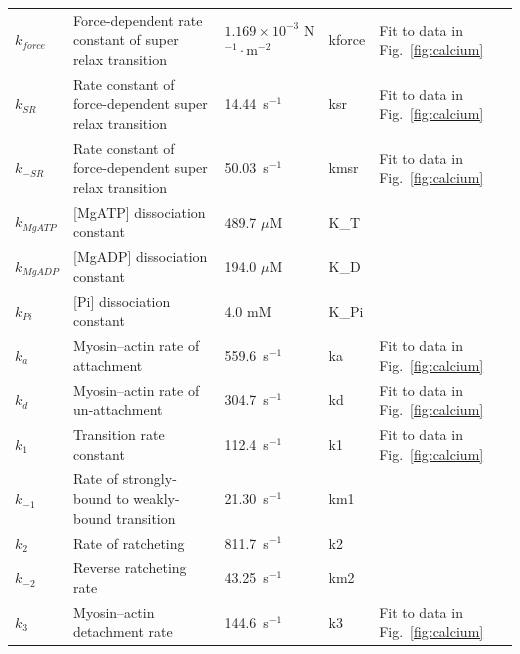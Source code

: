 \documentclass[fleqn,10pt]{physiome}
\begin{document}
\begin{table}[!htb]
\begin{supertabular}{p{1.4cm} p{4.4cm} p{1.8cm} p{2.0cm} p{2.0cm}}
$k_{force}$ & 
 Force-dependent  rate constant of super relax transition  & 
  $1.169 \times 10^{-3}$ N$^{-1}\cdot$m$^{-2}$ & kforce &
Fit to data in Fig.~\ref{fig:calcium}  \\

$k_{SR}$ & 
Rate constant of force-dependent super relax transition  & 
14.44~s$^{-1}$ & 
ksr &
Fit to data in Fig.~\ref{fig:calcium}  \\

$k_{-SR}$ & 
Rate constant of force-dependent super relax transition  & 
50.03~s$^{-1}$ & 
kmsr &
Fit to data in Fig.~\ref{fig:calcium}  \\

$k_{MgATP}$ & 
[MgATP] dissociation constant  & 
489.7 $\mu$M &
K\_T &
\cite{Tewari2016b} \\

$k_{MgADP}$ & 
[MgADP] dissociation constant  & 
194.0 $\mu$M &
K\_D &
\cite{Tewari2016b} \\

$k_{Pi}$ & 
[Pi] dissociation constant  & 
4.0 mM &
K\_Pi &
\cite{Tewari2016b} \\

$k_a$ & 
Myosin–actin rate of attachment  & 
559.6~s$^{-1}$ & 
ka &
Fit to data in Fig.~\ref{fig:calcium}  \\

$k_d$ & 
Myosin–actin rate of un-attachment  & 
304.7~s$^{-1}$ & 
kd &
Fit to data in Fig.~\ref{fig:calcium}  \\

$k_1$ & 
 Transition rate constant  & 
112.4~s$^{-1}$ & 
k1 &
Fit to data in Fig.~\ref{fig:calcium}  \\

$k_{-1}$ & 
Rate of strongly-bound to weakly-bound transition  & 
21.30~s$^{-1}$ & 
km1 & 
\cite{Tewari2016b} \\

$k_2$ & 
Rate of ratcheting  & 
811.7~s$^{-1}$ & 
k2 & 
\cite{Tewari2016b} \\

$k_{-2}$ & 
Reverse ratcheting rate  & 
43.25~s$^{-1}$ & 
km2 & 
\cite{Tewari2016b} \\

$k_3$ & 
 Myosin–actin  detachment rate  & 
144.6~s$^{-1}$ & 
k3 &
Fit to data in Fig.~\ref{fig:calcium}  \\

\bottomrule 
\end{supertabular}
\end{table}
\end{document}
